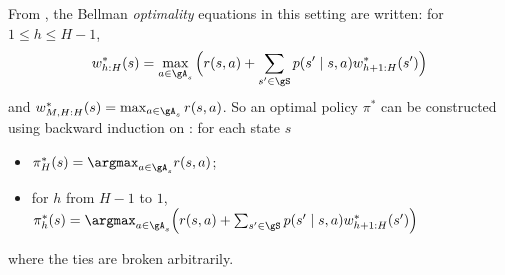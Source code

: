From \cite[Chapter~4]{puterman2014markov}, the Bellman \emph{optimality} equations in this setting are written: for $1\le h\le H-1$,
\begin{equation}
    \label{eq:finite_be_opt}
    w_{h:H}^{*}(s) = \max_{a\in\gA_s}\Big(r(s,a)+\sum_{s'\in\gS}p(s'\mid s,a)w_{h+1:H}^{*}(s')\Big)
\end{equation}
and $w_{M,H:H}^{*}(s) =\max_{a\in\gA_s}r(s,a)$.
So an optimal policy $\pi^*$ can be constructed using backward induction on : for each state $s$
\begin{itemize}
    \item $\pi^*_H(s)=\argmax_{a\in\gA_s}r(s,a)$;
    \item for $h$ from $H-1$ to $1$, $\pi^*_h(s)=\argmax_{a\in\gA_s}\Big(r(s,a)+\sum_{s'\in\gS}p(s'\mid s,a)w_{h+1:H}^{*}(s')\Big)$
\end{itemize}
where the ties are broken arbitrarily.

